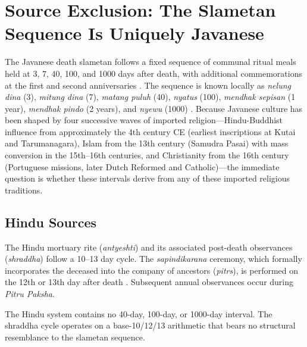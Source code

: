 \documentclass[12pt,a4paper]{article}
\begin{document}
\section{Source Exclusion: The Slametan Sequence Is Uniquely Javanese}

The Javanese death slametan follows a fixed sequence of communal ritual meals held at 3, 7, 40, 100, and 1000 days after death, with additional commemorations at the first and second anniversaries \citep{geertz_1960, koentjaraningrat_1994}. The sequence is known locally as \textit{nelung dina} (3), \textit{mitung dina} (7), \textit{matang puluh} (40), \textit{nyatus} (100), \textit{mendhak sepisan} (1 year), \textit{mendhak pindo} (2 years), and \textit{nyewu} (1000) \citep[433--435]{hendrajaya_2020}. Because Javanese culture has been shaped by four successive waves of imported religion---Hindu-Buddhist influence from approximately the 4th century CE (earliest inscriptions at Kutai and Tarumanagara), Islam from the 13th century (Samudra Pasai) with mass conversion in the 15th--16th centuries, and Christianity from the 16th century (Portuguese missions, later Dutch Reformed and Catholic)---the immediate question is whether these intervals derive from any of these imported religious traditions.

\subsection{Hindu Sources}

The Hindu mortuary rite (\textit{antyeshti}) and its associated post-death observances (\textit{shraddha}) follow a 10--13 day cycle. The \textit{sapindikarana} ceremony, which formally incorporates the deceased into the company of ancestors (\textit{pitrs}), is performed on the 12th or 13th day after death \citep{knipe_1977, parry_1994}. Subsequent annual observances occur during \textit{Pitru Paksha}.

The Hindu system contains no 40-day, 100-day, or 1000-day interval. The shraddha cycle operates on a base-10/12/13 arithmetic that bears no structural resemblance to the slametan sequence.
\end{document}
